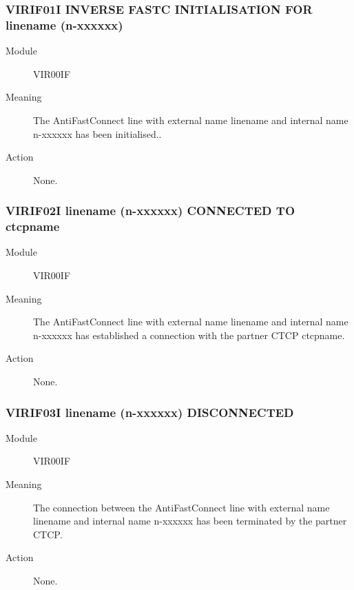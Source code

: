 \documentclass[letterpaper,10pt,english]{sphinxmanual}
\begin{document}
\subsubsection{VIRIF01I INVERSE FASTC INITIALISATION FOR linename (n-xxxxxx)}
\label{\detokenize{messages:virif01i-inverse-fastc-initialisation-for-linename-n-xxxxxx}}\begin{description}
\item[{Module}] \leavevmode
VIR00IF

\item[{Meaning}] \leavevmode
The AntiFastConnect line with external name linename and internal name n-xxxxxx has been initialised..

\item[{Action}] \leavevmode
None.

\end{description}


\subsubsection{VIRIF02I linename (n-xxxxxx) CONNECTED TO ctcpname}
\label{\detokenize{messages:virif02i-linename-n-xxxxxx-connected-to-ctcpname}}\begin{description}
\item[{Module}] \leavevmode
VIR00IF

\item[{Meaning}] \leavevmode
The AntiFastConnect line with external name linename and internal name n-xxxxxx has established a connection with the partner CTCP ctcpname.

\item[{Action}] \leavevmode
None.

\end{description}


\subsubsection{VIRIF03I linename (n-xxxxxx) DISCONNECTED}
\label{\detokenize{messages:virif03i-linename-n-xxxxxx-disconnected}}\begin{description}
\item[{Module}] \leavevmode
VIR00IF

\item[{Meaning}] \leavevmode
The connection between the AntiFastConnect line with external name linename and internal name n-xxxxxx has been terminated by the partner CTCP.

\item[{Action}] \leavevmode
None.

\end{description}
\end{document}
